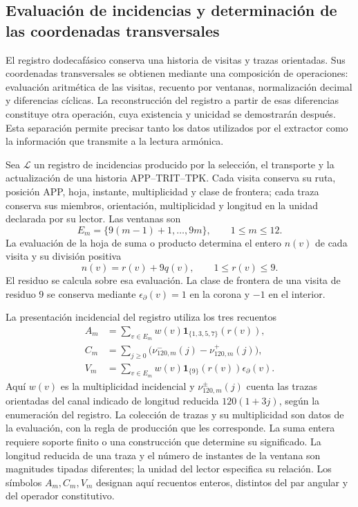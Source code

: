 \subsection{Evaluación de incidencias y determinación de las coordenadas transversales}
\label{iii:r25:incidencias}

El registro dodecafásico conserva una historia de visitas y trazas
orientadas. Sus coordenadas transversales se obtienen mediante una
composición de operaciones: evaluación aritmética de las visitas,
recuento por ventanas, normalización decimal y diferencias cíclicas.
La reconstrucción del registro a partir de esas diferencias constituye
otra operación, cuya existencia y unicidad se demostrarán después.
Esta separación permite precisar tanto los datos utilizados por el
extractor como la información que transmite a la lectura armónica.

Sea $\mathscr L$ un registro de incidencias producido por la selección,
el transporte y la actualización de una historia APP--TRIT--TPK.
Cada visita conserva su ruta, posición APP, hoja, instante,
multiplicidad y clase de frontera; cada traza conserva sus miembros,
orientación, multiplicidad y longitud en la unidad declarada por su
lector. Las ventanas son
\[
 E_m=\{9(m-1)+1,\ldots,9m\},\qquad 1\leq m\leq12.
\]
La evaluación de la hoja de suma o producto determina el entero
$n(v)$ de cada visita y su división positiva
\[
 n(v)=r(v)+9q(v),\qquad 1\leq r(v)\leq9.
\]
El residuo se calcula sobre esa evaluación. La clase de frontera de
una visita de residuo $9$ se conserva mediante
$\epsilon_\partial(v)=1$ en la corona y $-1$ en el interior.

La presentación incidencial del registro utiliza los tres recuentos
\begin{align}
 A_m&=\sum_{v\in E_m}w(v)
       \mathbf1_{\{1,3,5,7\}}(r(v)),\label{iii:r25:recuento-a}\\
 C_m&=\sum_{j\geq0}
       \bigl(\nu^-_{120,m}(j)-\nu^+_{120,m}(j)\bigr),
       \label{iii:r25:recuento-c}\\
 V_m&=\sum_{v\in E_m}w(v)
       \mathbf1_{\{9\}}(r(v))\epsilon_\partial(v).
       \label{iii:r25:recuento-v}
\end{align}
Aquí $w(v)$ es la multiplicidad incidencial y
$\nu^\pm_{120,m}(j)$ cuenta las trazas orientadas del canal indicado
de longitud reducida $120(1+3j)$, según la enumeración del registro.
La colección de trazas y su multiplicidad son datos de la evaluación,
con la regla de producción que les corresponde. La suma entera requiere
soporte finito o una construcción que determine su significado.
La longitud reducida de una traza y el número de instantes de la
ventana son magnitudes tipadas diferentes; la unidad del lector
especifica su relación. Los símbolos $A_m,C_m,V_m$ designan aquí
recuentos enteros, distintos del par angular y del operador constitutivo.

